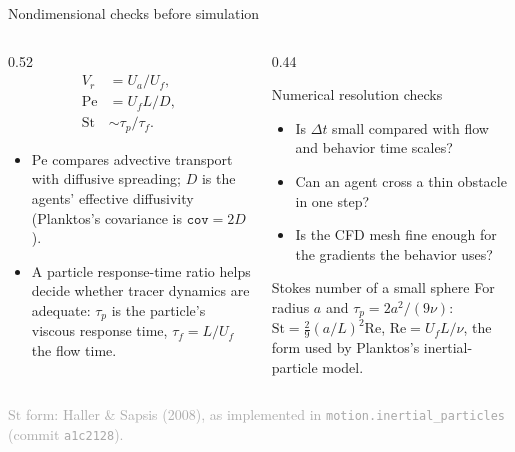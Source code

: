 \documentclass[aspectratio=169,11pt]{beamer}
\newcommand{\sourcecredit}[1]{\vfill\hfill{\tiny\textcolor{DarkGray}{#1}}}
\newcommand{\code}[1]{\texttt{#1}}
\begin{document}
\begin{frame}{Nondimensional checks before simulation}
\begin{columns}[T,onlytextwidth]
  \begin{column}{0.52\textwidth}
    \begin{align*}
      V_r &= U_a/U_f,\\
      \mathrm{Pe} &= U_f L/D,\\
      \mathrm{St} &\sim \tau_p/\tau_f.
    \end{align*}
    \begin{itemize}
      \item $\mathrm{Pe}$ compares advective transport with diffusive spreading; $D$ is the agents' effective diffusivity (Planktos's covariance is $\texttt{cov}=2D$).
      \item A particle response-time ratio helps decide whether tracer dynamics are adequate: $\tau_p$ is the particle's viscous response time, $\tau_f=L/U_f$ the flow time.
    \end{itemize}
  \end{column}
  \begin{column}{0.44\textwidth}
    \begin{block}{Numerical resolution checks}
      \begin{itemize}
        \item Is $\Delta t$ small compared with flow and behavior time scales?
        \item Can an agent cross a thin obstacle in one step?
        \item Is the CFD mesh fine enough for the gradients the behavior uses?
      \end{itemize}
    \end{block}
    \begin{block}{Stokes number of a small sphere}
      \small For radius $a$ and $\tau_p=2a^2/(9\nu)$: $\mathrm{St}=\tfrac29(a/L)^2\mathrm{Re}$, $\mathrm{Re}=U_fL/\nu$, the form used by Planktos's inertial-particle model.
    \end{block}
  \end{column}
\end{columns}
\sourcecredit{$\mathrm{St}$ form: Haller \& Sapsis (2008), as implemented in \code{motion.inertial\_particles} (commit \code{a1c2128}).}
\end{frame}
\end{document}
